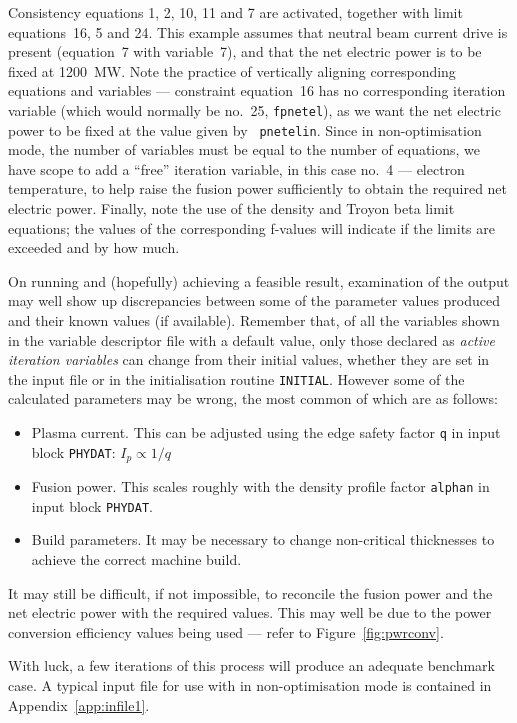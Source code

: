 Consistency equations 1, 2, 10, 11 and 7 are activated, together with limit
equations~16, 5 and 24. This example assumes that neutral beam current drive
is present (equation~7 with variable~7), and that the net electric power is to
be fixed at 1200~MW\@. Note the practice of vertically aligning corresponding
equations and variables --- constraint equation~16 has no corresponding
iteration variable (which would normally be no.\ 25, {\tt fpnetel}), as we
want the net electric power to be fixed at the value given by {\tt
pnetelin}. Since in non-optimisation mode, the number of variables must be
equal to the number of equations, we have scope to add a ``free'' iteration
variable, in this case no.\ 4 --- electron temperature, to help raise the
fusion power sufficiently to obtain the required net electric power. Finally,
note the use of the density and Troyon beta limit equations; the values of the
corresponding f-values will indicate if the limits are exceeded and by how
much.

On running \PS and (hopefully) achieving a feasible result, examination of the
output may well show up discrepancies between some of the parameter values
produced and their known values (if available). Remember that, of all the
variables shown in the variable descriptor file with a default value, only
those declared as {\em active iteration variables}\/ can change from their
initial values, whether they are set in the input file or in the
initialisation routine {\tt INITIAL}. However some of the calculated
parameters may be wrong, the most common of which are as follows:
\begin{itemize}
\item
Plasma current. This can be adjusted using the edge safety factor {\tt q} in
input block {\tt PHYDAT}: $I_p \propto 1/q$
\item
Fusion power. This scales roughly with the density profile factor {\tt alphan}
in input block {\tt PHYDAT}.
\item
Build parameters. It may be necessary to change non-critical thicknesses to
achieve the correct machine build.
\end{itemize}
It may still be difficult, if not impossible, to reconcile the fusion power
and the net electric power with the required values. This may well be due to
the power conversion efficiency values being used --- refer to
Figure~\ref{fig:pwrconv}.

With luck, a few iterations of this process will produce an adequate benchmark
case. A typical input file for use with \PS in non-optimisation mode is
contained in Appendix~\ref{app:infile1}.

